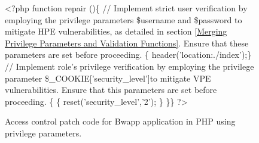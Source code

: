 \documentclass[10pt,journal,compsoc]{IEEEtran}
\begin{document}
\begin{CJK}{UTF8}{gbsn}
\begin{figure*}[h]
\begin{minipage}[t]{1\textwidth}
\begin{algorithm}[H]
\begin{algorithmic}[1]
\State \textless?php
\State function repair ()\{
    \Statex \textcolor[rgb]{0.16,0.32,0.66}{// Implement strict user verification by employing the privilege parameters \$username and \$password to mitigate HPE vulnerabilities, as detailed in section \ref{Merging Privilege Parameters and Validation Functions}. Ensure that these parameters are set before proceeding.}
    \{
            \State header('location:./index');\}
    \EndIf
         \Statex \textcolor[rgb]{0.16,0.32,0.66}{// Implement role's privilege verification by employing the privilege parameter \$\_COOKIE['security\_level']to mitigate VPE vulnerabilities. Ensure that this parameters are set before proceeding.}
        \{
        \{
            \State reset('security\_level','2'); \}
        \EndIf
    \EndIf
\State \}\}
\State?\textgreater 
\end{algorithmic}
\end{algorithm}
\end{minipage}
\caption{Access control patch code for Bwapp application in PHP using privilege parameters.}
\label{Bwapp}
\end{figure*}


\end{CJK}
\end{document}
